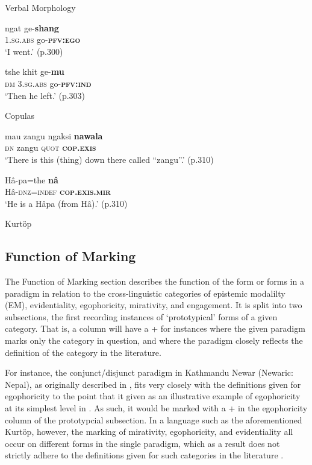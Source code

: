 \begin{exe}
\ex Verbal Morphology \label{e:Methods:KurtopScope1}
\begin{xlist}
\ex
\gll ngat ge-\textbf{shang} \\
1.\textsc{sg.abs} go-\textsc{\textbf{pfv:ego}} \\
\glt `I went.' (p.300)

\ex
\gll tshe khit ge-\textbf{mu} \\
\textsc{dm} \textsc{3.sg.abs} go-\textsc{\textbf{pfv:ind}} \\
\glt `Then he left.' (p.303)

\end{xlist}

\ex Copulas \label{e:Methods:KurtopScope2}
\begin{xlist}
\ex 
\gll mau zangu ngaksi \textbf{nawala} \\
\textsc{dn} zangu \textsc{quot} \textsc{\textbf{cop.exis}} \\
\glt `There is this (thing) down there called ``zangu''.' (p.310)

\ex
\gll Hâ-pa=the \textbf{nâ} \\
Hâ-\textsc{dnz=indef} \textsc{\textbf{cop.exis.mir}} \\
\glt `He is a Hâpa (from Hâ).' (p.310)
\end{xlist}
Kurtöp \cite[East Bodish: Bhutan,][]{Hyslop2017}
\end{exe}

\subsection{Function of Marking}\label{ss:Methods:Functions}
The Function of Marking section describes the function of the form or forms in a paradigm in relation to the cross-linguistic categories of epistemic modalilty (EM), evidentiality, egophoricity, mirativity, and engagement. It is split into two subsections, the first recording instances of `prototypical' forms of a given category. That is, a column will have a + for instances where the given paradigm marks only the category in question, and where the paradigm closely reflects the definition of the category in the literature.

For instance, the conjunct/disjunct paradigm in Kathmandu Newar (Newaric: Nepal), as originally described in , fits very closely with the definitions given for egophoricity to the point that it given as an illustrative example of egophoricity at its simplest level in . As such, it would be marked with a + in the egophoricity column of the prototypcial subsection. In a language such as the aforementioned Kurtöp, however, the marking of mirativity, egophoricity, and evidentiality all occur on different forms in the single paradigm, which as a result does not strictly adhere to the definitions given for such categories in the literature \cites{DeLancey2012}{EgoIntro}{Aikhenvald2018Intro}.

